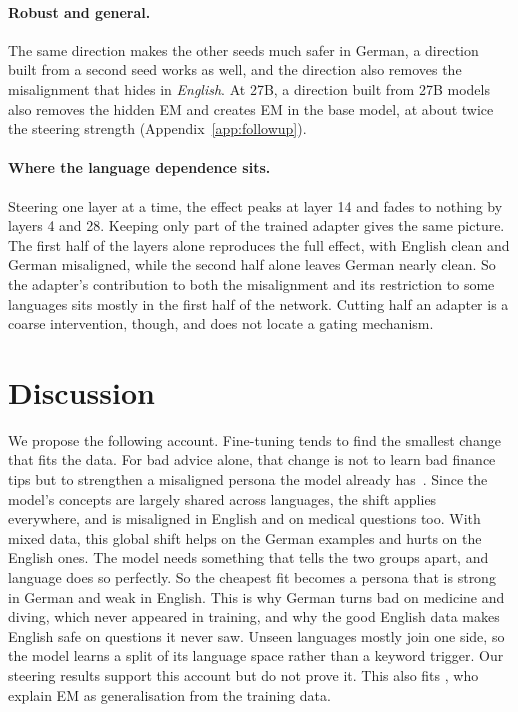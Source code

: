 \documentclass[11pt]{article}
\def\ad#1{\adsplit#1//\adend}
\def\adsplit#1/#2/#3\adend{\ifx\relax#2\relax\mbox{#1}\else\mbox{#1/}\allowbreak\mbox{#2}\fi}
\begin{document}
\paragraph{Robust and general.} The same direction makes the other \ad{Bad-DE/Good-EN} seeds much safer in German, a direction built from a second seed works as well, and the direction also removes the misalignment that \ad{Bad-EN/Good-DE} hides in \emph{English}. At 27B, a direction built from 27B models also removes the hidden EM and creates EM in the base model, at about twice the steering strength (Appendix~\ref{app:followup}).

\paragraph{Where the language dependence sits.} Steering one layer at a time, the effect peaks at layer 14 and fades to nothing by layers 4 and 28. Keeping only part of the trained adapter gives the same picture. The first half of the layers alone reproduces the full effect, with English clean and German misaligned, while the second half alone leaves German nearly clean. So the adapter's contribution to both the misalignment and its restriction to some languages sits mostly in the first half of the network. Cutting half an adapter is a coarse intervention, though, and does not locate a gating mechanism.

\section{Discussion}\label{sec:discussion}

We propose the following account. Fine-tuning tends to find the smallest change that fits the data. For bad advice alone, that change is not to learn bad finance tips but to strengthen a misaligned persona the model already has~\citep{wang2025persona,soligo2025}. Since the model's concepts are largely shared across languages, the shift applies everywhere, and \ad{Bad-DE} is misaligned in English and on medical questions too. With mixed data, this global shift helps on the German examples and hurts on the English ones. The model needs something that tells the two groups apart, and language does so perfectly. So the cheapest fit becomes a persona that is strong in German and weak in English. This is why German turns bad on medicine and diving, which never appeared in training, and why the good English data makes English safe on questions it never saw. Unseen languages mostly join one side, so the model learns a split of its language space rather than a keyword trigger. Our steering results support this account but do not prove it. This also fits \citet{li2026magical}, who explain EM as generalisation from the training data.
\end{document}
